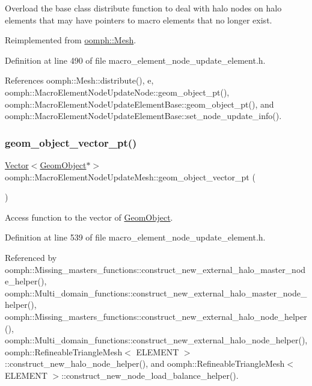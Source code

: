 Overload the base class distribute function to deal with halo nodes on halo elements that may have pointers to macro elements that no longer exist. 



Reimplemented from \hyperlink{classoomph_1_1Mesh_ad8a0c5d583e4f7bc1f498b5ab27afd94}{oomph\+::\+Mesh}.



Definition at line 490 of file macro\+\_\+element\+\_\+node\+\_\+update\+\_\+element.\+h.



References oomph\+::\+Mesh\+::distribute(), e, oomph\+::\+Macro\+Element\+Node\+Update\+Node\+::geom\+\_\+object\+\_\+pt(), oomph\+::\+Macro\+Element\+Node\+Update\+Element\+Base\+::geom\+\_\+object\+\_\+pt(), and oomph\+::\+Macro\+Element\+Node\+Update\+Element\+Base\+::set\+\_\+node\+\_\+update\+\_\+info().

\mbox{\label{classoomph_1_1MacroElementNodeUpdateMesh_ac533cc3ab7ae1d1c03cefba50ad5acff}} 
\subsubsection{\texorpdfstring{geom\+\_\+object\+\_\+vector\+\_\+pt()}{geom\_object\_vector\_pt()}}
{\footnotesize\ttfamily \hyperlink{classoomph_1_1Vector}{Vector}$<$\hyperlink{classoomph_1_1GeomObject}{Geom\+Object}$\ast$$>$ oomph\+::\+Macro\+Element\+Node\+Update\+Mesh\+::geom\+\_\+object\+\_\+vector\+\_\+pt (\begin{DoxyParamCaption}{ }\end{DoxyParamCaption})\hspace{0.3cm}{\ttfamily [inline]}}



Access function to the vector of \hyperlink{classoomph_1_1GeomObject}{Geom\+Object}. 



Definition at line 539 of file macro\+\_\+element\+\_\+node\+\_\+update\+\_\+element.\+h.



Referenced by oomph\+::\+Missing\+\_\+masters\+\_\+functions\+::construct\+\_\+new\+\_\+external\+\_\+halo\+\_\+master\+\_\+node\+\_\+helper(), oomph\+::\+Multi\+\_\+domain\+\_\+functions\+::construct\+\_\+new\+\_\+external\+\_\+halo\+\_\+master\+\_\+node\+\_\+helper(), oomph\+::\+Missing\+\_\+masters\+\_\+functions\+::construct\+\_\+new\+\_\+external\+\_\+halo\+\_\+node\+\_\+helper(), oomph\+::\+Multi\+\_\+domain\+\_\+functions\+::construct\+\_\+new\+\_\+external\+\_\+halo\+\_\+node\+\_\+helper(), oomph\+::\+Refineable\+Triangle\+Mesh$<$ E\+L\+E\+M\+E\+N\+T $>$\+::construct\+\_\+new\+\_\+halo\+\_\+node\+\_\+helper(), and oomph\+::\+Refineable\+Triangle\+Mesh$<$ E\+L\+E\+M\+E\+N\+T $>$\+::construct\+\_\+new\+\_\+node\+\_\+load\+\_\+balance\+\_\+helper().

